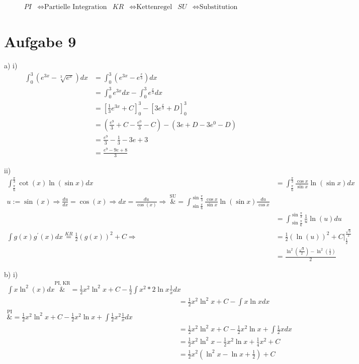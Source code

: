 \documentclass[10pt]{article}
\begin{document}
\thispagestyle{fancy}
\begin{align*}
	PI &\Leftrightarrow \text{Partielle Integration} &
	KR &\Leftrightarrow \text{Kettenregel} &
	SU &\Leftrightarrow \text{Substitution}
\end{align*}
\section*{Aufgabe 9}
\par{a) i)}
\begin{align*}
	\int_0^3 \left(e^{3x} - \sqrt[3]{e^x} \right) dx
	&= \int_0^3 \left(e^{3x} - e^{\frac x3} \right) dx \\
	&= \int_0^3 e^{3x} dx - \int_0^3 e^{\frac x3} dx \\
	&= \left[ \frac13 e^{3x} + C \right]_0^3 -
	\left[3 e^{\frac x 3} + D \right]_0^3 \\
	&= \left( \frac{e^9}{3} + C - \frac{e^0}{3} - C \right) -
	\left(3e + D - 3e^0 - D \right) \\
	&= \frac{e^9}{3} - \frac13 - 3e + 3 \\
	&= \frac{e^9 - 9e +8}{3}
\end{align*}
\par{ii)}
\begin{align*}
	\int_{\frac\pi6}^{\frac\pi3} \cot(x) \ln(\sin x) dx
	&= \int_{\frac\pi6}^{\frac\pi3} 
	\frac{\cos x}{\sin x} \ln(\sin x) dx \\
	u := \sin(x) \Rightarrow \frac{du}{dx} = \cos(x) 
	\Rightarrow dx = \frac{du}{\cos(x)}
	\Rightarrow \
	\overset{\text{SU}}&{=}
	\int_{\sin\frac\pi6}^{\sin\frac\pi3} 
	\frac{\cos x}{\sin x} \ln(\sin x) \frac{du}{\cos x} \\
	&= \int_{\sin\frac\pi6}^{\sin\frac\pi3}
	\frac1{u} \ln(u) du \\
	\int g(x) g^\prime(x) dx \overset{KR}{=} 
	\frac12\left(g(x)\right)^2 + C
	\Rightarrow \
	&= \frac12 \left(\ln(u)\right)^2 + C 
	\vert_{\frac12}^{\frac{\sqrt{3}}{2}} \\
	&= \frac{\ln^2\left(\frac{\sqrt{3}}{2}\right) 
	- \ln^2\left(\frac12\right)}{2}
\end{align*}
\newpage
\setlength{\headheight}{0cm}
\par{b) i)}
\begin{align*}
	\int x \ln^2(x) dx 
	\overset{\text{PI, KR}}&{=} 
	\frac12 x^2 \ln^2x + C - 
	\frac12 \int x^2 * 2\ln x \frac1x dx \\
	&= \frac12 x^2 \ln^2x + C - \int x \ln x dx \\
	\overset{\text{PI}}&{=}
	\frac12 x^2 \ln^2x + C - \frac12 x^2 \ln x 
	+ \int \frac12 x^2 \frac1x dx \\
	&=  \frac12 x^2 \ln^2x + C - \frac12 x^2 \ln x
	+ \int \frac12 x dx \\
	&=  \frac12 x^2 \ln^2x  - \frac12 x^2 \ln x
	+ \frac14 x^2  + C\\
	&= \frac12 x^2
	\left(\ln^2x - \ln x + \frac12\right) + C
\end{align*}
\end{document}
